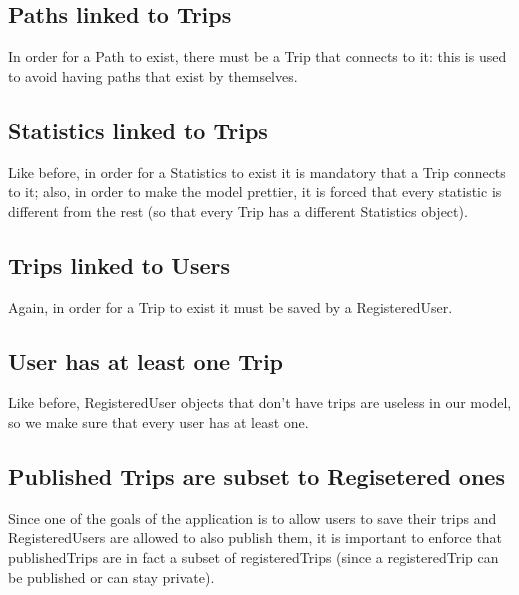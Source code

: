 \subsection{Paths linked to Trips}

In order for a Path to exist, there must be a Trip that connects to it: this is used to avoid having paths that exist by themselves.

\subsection{Statistics linked to Trips}

Like before, in order for a Statistics to exist it is mandatory that a Trip connects to it; also, in order to make the model prettier, it is forced that every statistic is different from the rest (so that every Trip has a different Statistics object).

\subsection{Trips linked to Users}

Again, in order for a Trip to exist it must be saved by a RegisteredUser.


\subsection{User has at least one Trip}

Like before, RegisteredUser objects that don't have trips are useless in our model, so we make sure that every user has at least one.

\subsection{Published Trips are subset to Regisetered ones}

Since one of the goals of the application is to allow users to save their trips and RegisteredUsers are allowed to also publish them, it is important to enforce that publishedTrips are in fact a subset of registeredTrips (since a registeredTrip can be published or can stay private).

